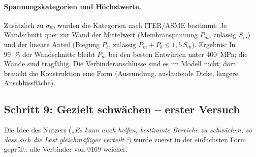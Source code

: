 \paragraph{Spannungskategorien und Höchstwerte.} Zusätzlich zu $\sigma_{99}$ wurden die Kategorien nach ITER/ASME
bestimmt: Je Wandschnitt quer zur Wand der Mittelwert (Membranspannung $P_m$, zulässig $S_m$) und der lineare Anteil
(Biegung $P_b$, zulässig $P_m+P_b\le1{,}5\,S_m$).
Ergebnis: In 99~\% der Wandschnitte bleibt $P_m$ bei den besten Entwürfen unter \SI{400}{MPa}; die Wände sind
tragfähig. Die Verbinderanschlüsse sind es im Modell nicht; dort braucht die Konstruktion eine Form (Ausrundung,
auslaufende Dicke, längere Anschlussfläche).

\subsection*{Schritt 9: Gezielt schwächen -- erster Versuch}
Die Idee des Nutzers (\emph{„Es kann auch helfen, bestimmte Bereiche zu schwächen, so dass sich die Last gleichmäßiger
verteilt.“}) wurde zuerst in der einfachsten Form geprüft: alle Verbinder von 0169 weicher.
\begin{table}[H]\centering\scriptsize\caption{0169 mit weicheren
Verbindern; Nummern 1xx Standardnetz, 2xx feines Netz (Original: \SI{183}{GPa}).}\end{table}


